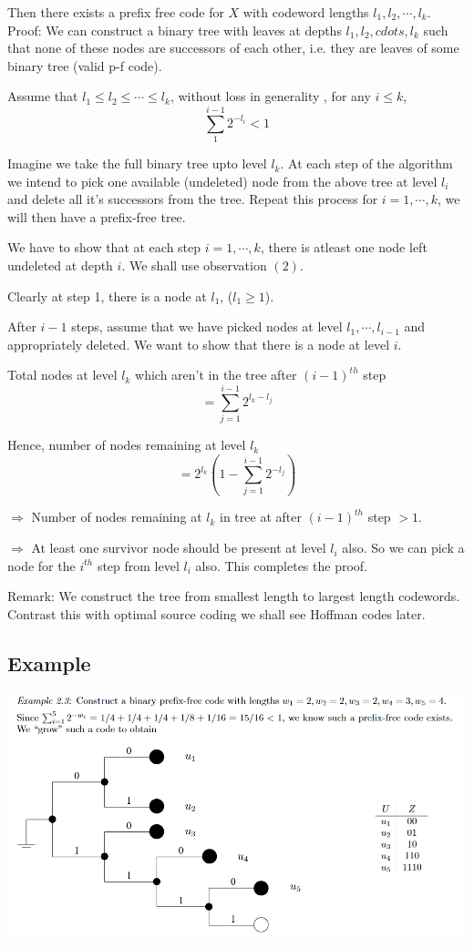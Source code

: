 \documentclass{article}
\begin{document}
 Then there exists a prefix free code for $X$ with codeword lengths $l_1 , l_2 , \cdots, l_k$.\\

 Proof: We can construct a binary tree with leaves at depths $l_1, l_2, cdots, l_k$ such that none of these nodes are successors of each other, i.e. they are leaves of some binary tree (valid p-f code).

 Assume that $l_1 \leq l_2 \leq \cdots \leq l_k$, without loss in generality    , for any $i \leq k$,
 \begin{equation}
     \sum_{1}^{i-1} 2^{-l_i} <1
 \end{equation}

Imagine we take the full binary tree upto level $l_k$. At each step of the algorithm we intend to pick one available (undeleted) node from the above tree at level $l_i$ and delete all it's successors from the tree. Repeat this process for $i=1, \cdots , k$, we will then have a prefix-free tree.

We have to show that at each step $i=1, \cdots, k$, there is atleast one node left undeleted at depth $i$. We shall use observation $(2)$.

Clearly at step 1, there is a node at $l_1$, ($l_1 \geq 1$).

After $i-1$ steps, assume that we have picked nodes at level $l_1, \cdots, l_{i-1}$ and appropriately deleted. We want to show that there is a node at level $i$.

Total nodes at level $l_k$ which aren't in the tree after $(i-1)^{th}$ step
$$ = \sum_{j=1}^{i-1} 2^{l_k -l_j}$$

Hence, number of nodes remaining at level $l_k$
$$ = 2^{l_k}(1- \sum_{j=1}^{i-1}2^{-l_j})$$

$\Rightarrow$ Number of nodes remaining at $l_k$ in tree at after $(i-1)^{th}$ step $>1$.

$\Rightarrow$ At least one  survivor node should be present at level $l_i$ also. So we can pick a node for the $i^{th}$ step from level $l_i$ also. This completes the proof.

Remark: We construct the tree from smallest length to largest length codewords. Contrast this with optimal source coding we shall see Hoffman codes later.

\subsection{Example}
\includegraphics[width=\textwidth]{p-feg.png}
\end{document}
